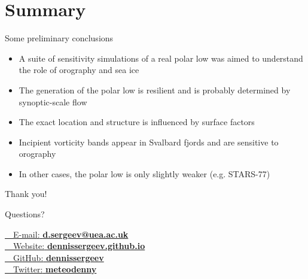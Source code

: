 \documentclass[10pt,draft]{beamer}
\newcommand{\emailsymbol}   {\faEnvelope~~}  %
\newcommand{\homepagesymbol}{\faGlobe~~}  %
\newcommand{\twittersymbol} {\faTwitter~~}
\newcommand{\githubsymbol}  {\faGithub~~}
\begin{document}
\section{Summary}
\begin{frame}{Some preliminary conclusions}
\begin{itemize}
\item A suite of sensitivity simulations of a real polar low was aimed to understand the role of orography and sea ice
\item The generation of the polar low is resilient and is probably determined by \alert{synoptic-scale flow}
\item The \alert{exact location} and structure is influenced by surface factors
\item Incipient vorticity bands appear in \alert{Svalbard fjords} and are sensitive to orography
\item In other cases, the polar low is only slightly weaker (e.g. STARS-77)
\end{itemize}
\end{frame}

{
\begin{frame}{Thank you!}

{\Huge Questions?}
\vspace{2cm}

\href{mailto:d.sergeev@uea.ac.uk}{\emailsymbol \small{E-mail:} \textbf{d.sergeev@uea.ac.uk}}\\
\href{https://dennissergeev.github.io}{\homepagesymbol \small{Website:} \textbf{dennissergeev.github.io}}\\
\href{http://github.com/dennissergeev}{\githubsymbol \small{GitHub:} \textbf{dennissergeev}}\\
\href{http://twitter.com/meteodenny}{\twittersymbol \small{Twitter:} \textbf{meteodenny}}
\end{frame}
}






\end{document}
